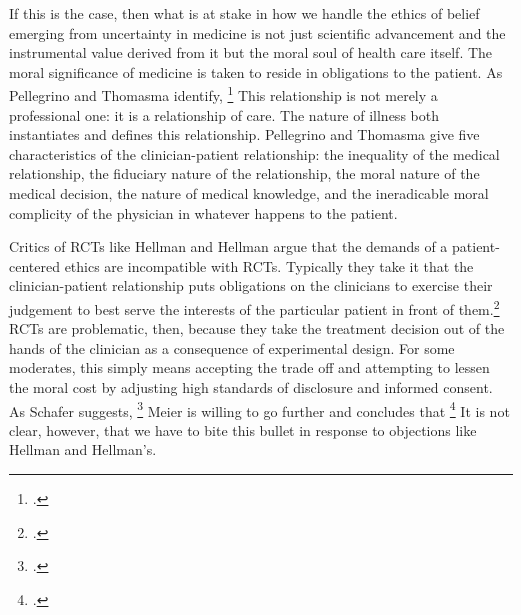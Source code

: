 \documentclass[letterpaper,notitlepage,12pt]{article}
\begin{document}
If this is the case, then what is at stake in how we handle the ethics of belief
emerging from uncertainty in medicine is not just scientific advancement and the
instrumental value derived from it but the moral soul of health care itself.
The moral significance of medicine is taken to reside in obligations to the
patient.
As Pellegrino and Thomasma identify, \footcite[p. 40]{pellegrino_virtues_1993}
This relationship is not merely a professional one: it is a relationship of
care.
The nature of illness both instantiates and defines this relationship.
Pellegrino and Thomasma give five characteristics of the clinician-patient
relationship: the inequality of the medical relationship, the fiduciary nature
of the relationship, the moral nature of the medical decision, the nature of
medical knowledge, and the ineradicable moral complicity of the physician in
whatever happens to the patient.

Critics of RCTs like Hellman and Hellman argue that the demands of a
patient-centered ethics are incompatible with RCTs.
Typically they take it that the clinician-patient relationship puts obligations
on the clinicians to exercise their judgement to best serve the interests of the
particular patient in front of them.\footcite[p. 1585]{hellman_mice_1991}
RCTs are problematic, then, because they take the treatment decision out of the
hands of the clinician as a consequence of experimental design.
For some moderates, this simply means accepting the trade off and attempting to
lessen the moral cost by adjusting high standards of disclosure and informed
consent.
As Schafer suggests, \footcite[p. 6]{schafer_commentary_1985}
Meier is willing to go further and concludes that \footcite[p. 640]{meier_terminating_1979}
It is not clear, however, that we have to bite this bullet in response to
objections like Hellman and Hellman's.
\end{document}
